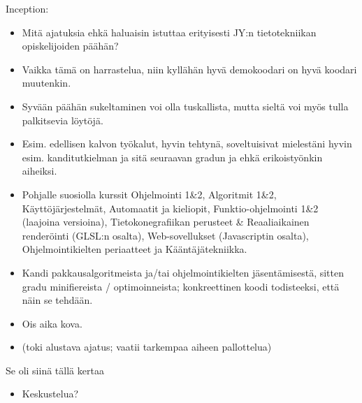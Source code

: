 \documentclass[pdf,10pt]{beamer}
\begin{document}
\begin{frame}{Inception:}
  \begin{itemize}
    \item Mitä ajatuksia ehkä haluaisin istuttaa erityisesti JY:n
      tietotekniikan opiskelijoiden päähän?
    \item Vaikka tämä on harrastelua, niin kyllähän hyvä demokoodari
      on hyvä koodari muutenkin.
    \item Syvään päähän sukeltaminen voi olla tuskallista, mutta
      sieltä voi myös tulla palkitsevia löytöjä.
    \item Esim. edellisen kalvon työkalut, hyvin tehtynä,
      soveltuisivat mielestäni hyvin esim. kanditutkielman ja sitä
      seuraavan gradun ja ehkä erikoistyönkin aiheiksi.
    \item Pohjalle suosiolla kurssit Ohjelmointi 1\&2, Algoritmit
      1\&2, Käyttöjärjestelmät, Automaatit ja kieliopit,
      Funktio-ohjelmointi 1\&2 (laajoina versioina),
      Tietokonegrafiikan perusteet \& Reaaliaikainen renderöinti
      (GLSL:n osalta), Web-sovellukset (Javascriptin osalta),
      Ohjelmointikielten periaatteet ja Kääntäjätekniikka.
    \item Kandi pakkausalgoritmeista ja/tai ohjelmointikielten
      jäsentämisestä, sitten gradu minifiereista / optimoinneista;
      konkreettinen koodi todisteeksi, että näin se tehdään.
    \item[] Ois aika kova.
    \item[] (toki alustava ajatus; vaatii tarkempaa aiheen
      pallottelua)
  \end{itemize}
\end{frame}

\begin{frame}{Se oli siinä tällä kertaa}
  \begin{itemize}
    \item Keskustelua?
  \end{itemize}
\end{frame}
\end{document}

